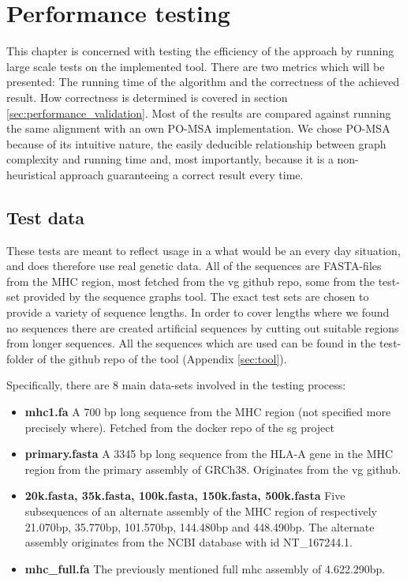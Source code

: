 \documentclass[thesis.tex]{subfiles}
\begin{document}
\chapter{Performance testing}
This chapter is concerned with testing the efficiency of the approach by running large scale tests on the implemented tool. There are two metrics which will be presented: The running time of the algorithm and the correctness of the achieved result. How correctness is determined is covered in section \ref{sec:performance_validation}. Most of the results are compared against running the same alignment with an own PO-MSA implementation. We chose PO-MSA because of its intuitive nature, the easily deducible relationship between graph complexity and running time and, most importantly, because it is a non-heuristical approach guaranteeing a correct result every time.
\section{Test data}
These tests are meant to reflect usage in a what would be an every day situation, and does therefore use real genetic data. All of the sequences are FASTA-files from the MHC region, most fetched from the vg github repo\cite{vg}, some from the test-set provided by the sequence graphs tool\cite{sequence_graphs}. The exact test sets are chosen to provide a variety of sequence lengths. In order to cover lengths where we found no sequences there are created artificial sequences by cutting out suitable regions from longer sequences. All the sequences which are used can be found in the test-folder of the github repo of the tool (Appendix \ref{sec:tool}).\\
\par\noindent
Specifically, there are 8 main data-sets involved in the testing process:
\begin{itemize}
  \item \textbf{mhc1.fa} A 700 bp long sequence from the MHC region (not specified more precisely where). Fetched from the docker repo of the sg project
  \item \textbf{primary.fasta} A 3345 bp long sequence from the HLA-A gene in the MHC region from the primary assembly of GRCh38. Originates from the vg github.
  \item \textbf{20k.fasta, 35k.fasta, 100k.fasta, 150k.fasta, 500k.fasta} Five subsequences of an alternate assembly of the MHC region of respectively 21.070bp, 35.770bp, 101.570bp, 144.480bp and 448.490bp. The alternate assembly originates from the NCBI database\cite{ncbi} with id NT\_167244.1.
  \item \textbf{mhc\_full.fa} The previously mentioned full mhc assembly of 4.622.290bp.
\end{itemize}
\end{document}
